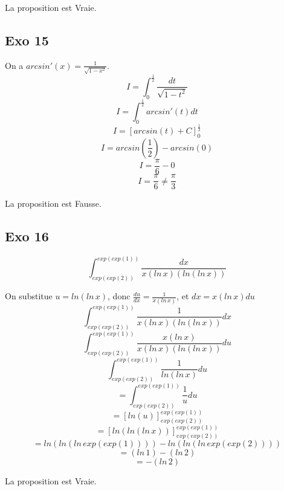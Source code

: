 \documentclass[]{book}
\theoremstyle{definition}
\begin{document}
La proposition est Vraie.

\subsection*{Exo 15}

On a $arcsin'(x) = \frac{1}{\sqrt{1-x^2}}$.
$$I=\int_{0}^{\frac{1}{2}}\frac{dt}{\sqrt{1-t^2}}$$
$$I=\int_{0}^{\frac{1}{2}}arcsin'(t)dt$$
$$I=[arcsin(t)+C]_{0}^{\frac{1}{2}}$$
$$I=arcsin(\frac{1}{2}) - arcsin(0)$$
$$I=\frac{\pi}{6} - 0$$
$$I=\frac{\pi}{6} \neq \frac{\pi}{3}$$


La proposition est Fausse.

\subsection*{Exo 16}
$$\int_{exp(exp(2))}^{exp(exp(1))} \frac{dx}{x(ln\,x)(ln(ln\,x))}$$

On substitue $u=ln(ln\,x)$, donc $\frac{du}{dx}=\frac{1}{x(ln\,x)}$, et $dx={x(ln\,x)du}$
$$\int_{exp(exp(2))}^{exp(exp(1))} \frac{1}{x(ln\,x)(ln(ln\,x))}dx$$
$$\int_{exp(exp(2))}^{exp(exp(1))} \frac{x(ln\,x)}{x(ln\,x)(ln(ln\,x))}du$$
$$\int_{exp(exp(2))}^{exp(exp(1))} \frac{1}{ln(ln\,x)}du$$
$$ = \int_{exp(exp(2))}^{exp(exp(1))} \frac{1}{u}du$$
$$ =[ln(u)]_{exp(exp(2))}^{exp(exp(1))}$$
$$ =[ln(ln(ln\,x))]_{exp(exp(2))}^{exp(exp(1))}$$
$$ = ln(ln(ln\,exp(exp(1)))) - ln(ln(ln\,exp(exp(2))))$$
$$ = (ln\, 1) - (ln\, 2)$$
$$ = -(ln\, 2)$$

La proposition est Vraie.
\end{document}
